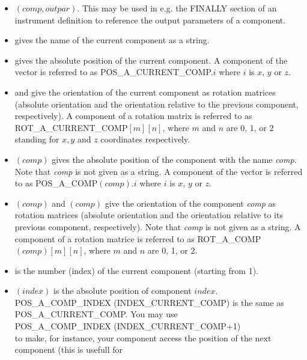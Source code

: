 \begin{itemize}
\item {}$(comp, outpar)$. This may be used in e.g. the FINALLY section of an
  instrument definition to reference the output parameters of a
  component.
\item {} gives the name of the current component as a string.
\item {} gives the absolute position of the
  current component. A component of the vector is referred to as
  POS\_A\_CURRENT\_COMP.$i$ where $i$ is $x$, $y$ or $z$.
\item {} and
   give the orientation
  of the current component as rotation matrices
  (absolute orientation and the orientation relative to
  the previous component, respectively). A
  component of a rotation matrix is referred to as
  ROT\_A\_CURRENT\_COMP$[m][n]$, where $m$ and
  $n$ are 0, 1, or 2 standing for $x,y$ and $z$ coordinates respectively.
\item {}$(comp)$ gives the absolute position
  of the component with the name {\em comp}. Note that
  {\em comp} is not given as a string. A component of the
  vector is referred to as POS\_A\_COMP$(comp).i$
  where $i$ is $x$, $y$ or $z$.
\item {}$(comp)$ and
  $(comp)$ give the orientation of the
  component {\em comp} as rotation matrices (absolute
  orientation and the orientation relative to its
  previous component, respectively). Note that {\em comp}
  is not given as a string. A component of  a rotation
  matrice is referred to as
  ROT\_A\_COMP$(comp)[m][n]$, where $m$ and $n$ are
  0, 1, or 2.
\item {} is the number (index) of the
       current component  (starting from 1).
\item {}$(index)$ is the absolute position of
  component $index$. \\
  POS\_A\_COMP\_INDEX (INDEX\_CURRENT\_COMP) is the same as \\
  POS\_A\_CURRENT\_COMP. You may use \\
  POS\_A\_COMP\_INDEX  (INDEX\_CURRENT\_COMP+1) \\
  to make, for instance, your
  component access the position of the next component (this is usefull for

\end{itemize}
